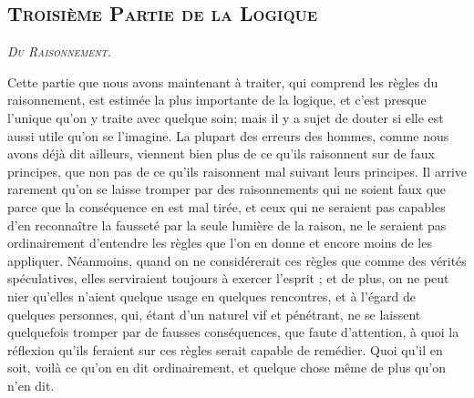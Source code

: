 \subsection{\centering \huge \scshape Troisième Partie de la Logique}
\begin{center}\emph{\Large\scshape Du Raisonnement.}\end{center}

Cette partie que nous avons maintenant à traiter, qui comprend les règles du raisonnement, est estimée la plus importante de la logique, et c'est presque l'unique qu'on y traite avec quelque soin; mais il y a sujet de douter si elle est aussi utile qu'on se l'imagine. La plupart des erreurs des hommes, comme nous avons déjà dit ailleurs, viennent bien plus de ce qu'ils raisonnent sur de faux principes, que non pas de ce qu'ils raisonnent mal suivant leurs principes. Il arrive rarement qu'on se laisse tromper par des raisonnements qui ne soient faux que parce que la conséquence en est mal tirée, et ceux qui ne seraient pas capables d'en reconnaître la fausseté par la seule lumière de la raison, ne le seraient pas ordinairement d'entendre les règles que l'on en donne et encore moins de les appliquer. Néanmoins, quand on ne considérerait ces règles que comme des vérités spéculatives, elles serviraient toujours à exercer l'esprit ; et de plus, on ne peut nier qu'elles n'aient quelque usage en quelques rencontres, et à l'égard de quelques personnes, qui, étant d'un naturel vif et pénétrant, ne se laissent quelquefois tromper par de fausses conséquences, que faute d'attention, à quoi la réflexion qu'ils feraient sur ces règles serait capable de remédier. Quoi qu'il en soit, voilà ce qu'on en dit ordinairement, et quelque chose même de plus qu'on n'en dit.
